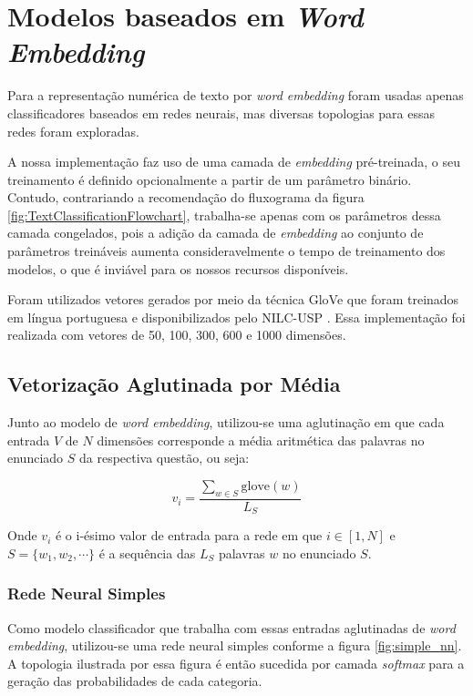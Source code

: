 \chapter{Modelos baseados em \textit{Word Embedding}} \label{We_implementation}

Para a representação numérica de texto por \textit{word embedding} foram usadas apenas classificadores baseados em redes neurais, mas diversas topologias para essas redes foram exploradas.

A nossa implementação faz uso de uma camada de \textit{embedding} pré-treinada, o seu treinamento é definido opcionalmente a partir de um parâmetro binário. Contudo, contrariando a recomendação do fluxograma da figura \ref{fig:TextClassificationFlowchart}, trabalha-se apenas com os parâmetros dessa camada congelados, pois a adição da camada de \textit{embedding} ao conjunto de parâmetros treináveis aumenta consideravelmente o tempo de treinamento dos modelos, o que é inviável para os nossos recursos disponíveis.

Foram utilizados vetores gerados por meio da técnica GloVe \citep{pennington2014glove} que foram treinados em língua portuguesa e disponibilizados pelo NILC-USP \citep{DBLP:journals/corr/abs-1708-06025}. Essa implementação foi realizada com vetores de 50, 100, 300, 600 e 1000 dimensões.

\section{Vetorização Aglutinada por Média}

Junto ao modelo de \textit{word embedding}, utilizou-se uma aglutinação em que cada entrada $V$ de $N$ dimensões corresponde a média aritmética das palavras no enunciado $S$ da respectiva questão, ou seja:

$$v_i = \dfrac {\sum_{w \in S} \text{glove}(w)} {L_S}$$

Onde $v_i$ é o i-ésimo valor de entrada para a rede em que $i \in [1,N]$ e $S = \{w_1, w_2, \cdots\}$ é a sequência das $L_S$ palavras $w$ no enunciado $S$.

\subsection{Rede Neural Simples}

Como modelo classificador que trabalha com essas entradas aglutinadas de \textit{word embedding}, utilizou-se uma rede neural simples conforme a figura \ref{fig:simple_nn}. A topologia ilustrada por essa figura é então sucedida por camada \textit{softmax} para a geração das probabilidades de cada categoria.


